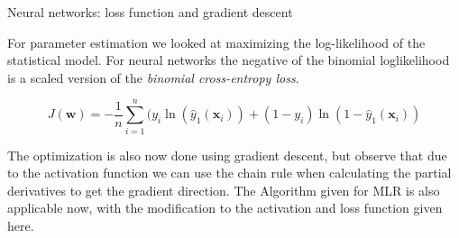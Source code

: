 \documentclass[10pt,ignorenonframetext,]{beamer}
\begin{document}
\begin{frame}

\end{frame}

\begin{frame}

\begin{block}{Neural networks: loss function and gradient descent}

For parameter estimation we looked at maximizing the log-likelihood of
the statistical model. For neural networks the negative of the binomial
loglikelihood is a scaled version of the \emph{binomial cross-entropy
loss}.

\[ J({\boldsymbol w})=-\frac{1}{n}\sum_{i=1}^n (y_i\ln({\hat{y}_1({\boldsymbol x}_i)})+(1-y_i)\ln(1-{\hat{y}_1({\boldsymbol x}_i)})\]

The optimization is also now done using gradient descent, but observe
that due to the activation function we can use the chain rule when
calculating the partial derivatives to get the gradient direction. The
Algorithm given for MLR is also applicable now, with the modification to
the activation and loss function given here.

\end{block}

\end{frame}
\end{document}
